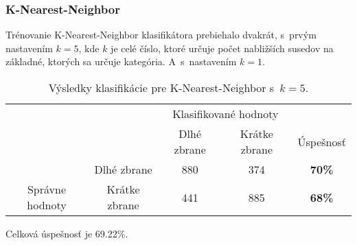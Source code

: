 \subsubsection{K-Nearest-Neighbor}
Trénovanie K-Nearest-Neighbor klasifikátora prebiehalo dvakrát, s~prvým nastavením $k=5$, kde $k$ je celé číslo, ktoré určuje
    počet nabližších susedov na základné, ktorých sa určuje kategória.
A~s~nastavením $k=1$.

\begin{table}[H]
    \centering
    \begin{tabular}{ccccc}
                                                                &                                    & \multicolumn{2}{c}{Klasifikované hodnoty}                                                         &                                    \\ \cline{3-5} 
                                                                & \multicolumn{1}{c|}{}              & \multicolumn{1}{c|}{Dlhé zbrane}                & \multicolumn{1}{c|}{Krátke zbrane}              & \multicolumn{1}{c|}{Úspešnosť}     \\ \cline{2-5} 
        \multicolumn{1}{c|}{}                                  & \multicolumn{1}{c|}{Dlhé zbrane}   & \multicolumn{1}{c|}{{\color[HTML]{009901} 880}} & \multicolumn{1}{c|}{{\color[HTML]{9A0000} 374}} & \multicolumn{1}{c|}{\textbf{70\%}} \\ \cline{2-5} 
        \multicolumn{1}{c|}{\multirow{-2}{*}{Správne hodnoty}} & \multicolumn{1}{c|}{Krátke zbrane} & \multicolumn{1}{c|}{{\color[HTML]{9A0000} 441}} & \multicolumn{1}{c|}{{\color[HTML]{009901} 885}} & \multicolumn{1}{c|}{\textbf{68\%}} \\ \cline{2-5} 
    \end{tabular}
    \caption{Výsledky klasifikácie pre K-Nearest-Neighbor s~$k=5$.}
    \label{tab:kmeans5}
\end{table}
Celková úspešnosť je 69.22\%.

